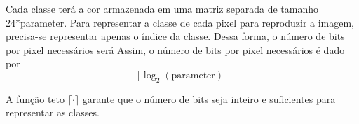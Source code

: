 Cada classe terá a cor armazenada em uma matriz separada de tamanho 24*parameter. Para representar a classe de cada pixel para reproduzir
a imagem, precisa-se representar apenas o índice da classe. Dessa forma, o número de bits por pixel necessários será Assim, o número de bits por pixel necessários é dado por
\[
    \lceil \log_{2}(\text{parameter}) \rceil
\]

A função teto $\lceil \cdot \rceil$ garante que o número de bits seja inteiro e suficientes para representar as classes.